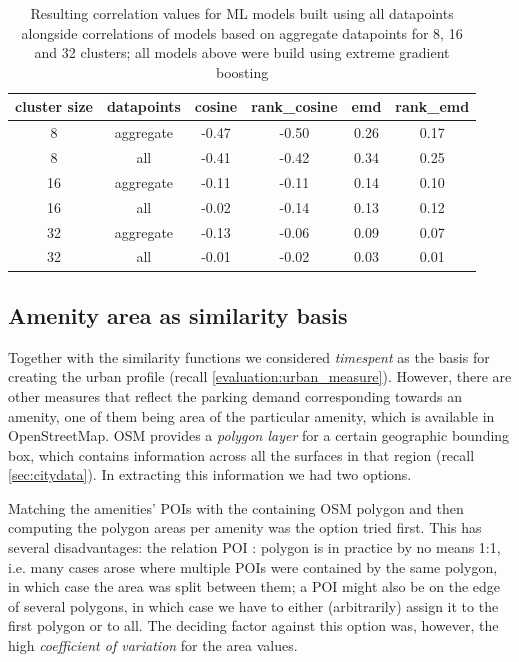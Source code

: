 {\begin{table}[!ht]
	{\color{green}
	\centering
	\small
	\begin{tabular}{ | c | c | c | c | c | c | }
		\hline
		{cluster size} & datapoints & cosine & rank\_cosine & emd & rank\_emd \\ \hline
		8	&	aggregate	&	-0.47	&	-0.50	&	0.26	&	0.17 \\ \hline
		8	&	all		&	-0.41	&	-0.42	&	0.34	&	0.25 \\ \hline
		16	&	aggregate	&	-0.11	&	-0.11	&	0.14	&	0.10 \\ \hline
		16	&	all		&	-0.02	&	-0.14	&	0.13	&	0.12 \\ \hline
		32	&	aggregate	&	-0.13	&	-0.06	&	0.09	&	0.07 \\ \hline
		32	&	all		&	-0.01	&	-0.02	&	0.03	&	0.01 \\ \hline
	\end{tabular}%
	\caption{\color{green} Resulting correlation values for ML models built using all datapoints alongside correlations of models based on aggregate datapoints for 8, 16 and 32 clusters; all models above were build using extreme gradient boosting}
	\label{extensions:correlation_values}}
\end{table}


\subsection{Amenity area as similarity basis}
\label{extensions:amenity_area}
Together with the similarity functions we considered \textit{timespent} as the basis for creating the urban profile (recall \autoref{evaluation:urban_measure}). However, there are other measures that reflect the parking demand corresponding towards an amenity, one of them being area of the particular amenity, which is available in OpenStreetMap. OSM provides a \textit{polygon layer} for a certain geographic bounding box, which contains information across all the surfaces in that region (recall \autoref{sec:citydata}). In extracting this information we had two options. 

Matching the amenities' POIs with the containing OSM polygon and then computing the polygon areas per amenity was the option tried first. This has several disadvantages: the relation POI : polygon is in practice by no means 1:1, i.e. many cases arose where multiple POIs were contained by the same polygon, in which case the area was split between them; a POI might also be on the edge of several polygons, in which case we have to either (arbitrarily) assign it to the first polygon or to all. The deciding factor against this option was, however, the high \textit{coefficient of variation} for the area values. 

}
